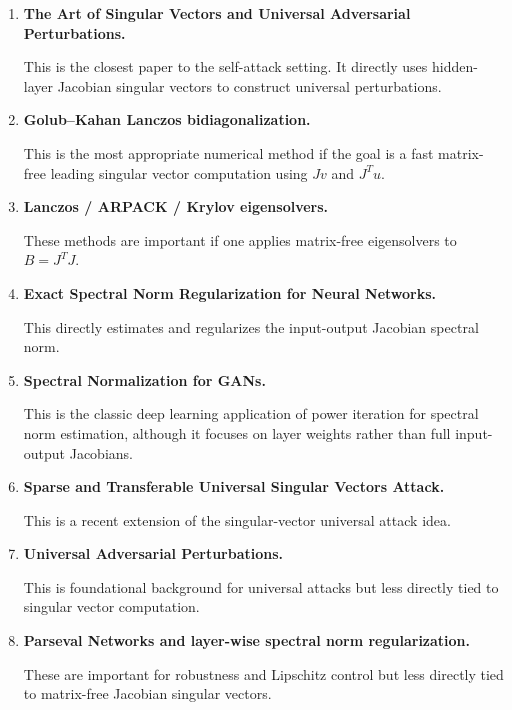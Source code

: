 \documentclass{article}
\begin{document}
\begin{enumerate}
    \item \textbf{The Art of Singular Vectors and Universal Adversarial Perturbations.}
    
    This is the closest paper to the self-attack setting. It directly uses hidden-layer Jacobian singular vectors to construct universal perturbations.

    \item \textbf{Golub--Kahan Lanczos bidiagonalization.}
    
    This is the most appropriate numerical method if the goal is a fast matrix-free leading singular vector computation using \(Jv\) and \(J^Tu\).

    \item \textbf{Lanczos / ARPACK / Krylov eigensolvers.}
    
    These methods are important if one applies matrix-free eigensolvers to \(B=J^TJ\).

    \item \textbf{Exact Spectral Norm Regularization for Neural Networks.}
    
    This directly estimates and regularizes the input-output Jacobian spectral norm.

    \item \textbf{Spectral Normalization for GANs.}
    
    This is the classic deep learning application of power iteration for spectral norm estimation, although it focuses on layer weights rather than full input-output Jacobians.

    \item \textbf{Sparse and Transferable Universal Singular Vectors Attack.}
    
    This is a recent extension of the singular-vector universal attack idea.

    \item \textbf{Universal Adversarial Perturbations.}
    
    This is foundational background for universal attacks but less directly tied to singular vector computation.

    \item \textbf{Parseval Networks and layer-wise spectral norm regularization.}
    
    These are important for robustness and Lipschitz control but less directly tied to matrix-free Jacobian singular vectors.
\end{enumerate}
\end{document}
